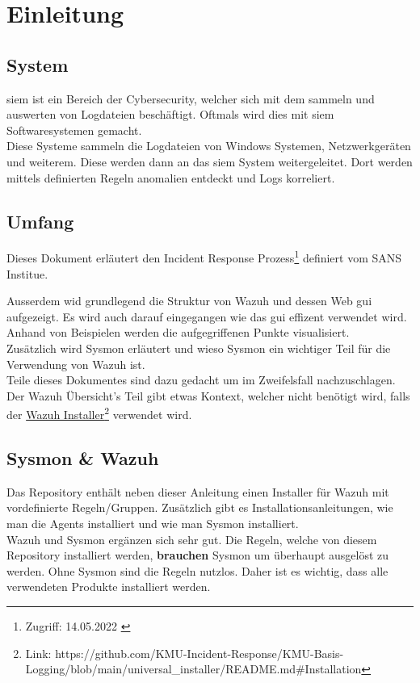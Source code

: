 \chapter{Einleitung}

\section{ System}
\acrfull{siem} ist ein Bereich der Cybersecurity, welcher sich mit dem sammeln und auswerten von Logdateien beschäftigt.
Oftmals wird dies mit \acrshort{siem} Softwaresystemen gemacht.\\

Diese Systeme sammeln die Logdateien von Windows Systemen, Netzwerkgeräten und weiterem.
Diese werden dann an das \acrshort{siem} System weitergeleitet.
Dort werden mittels definierten Regeln anomalien entdeckt und Logs korreliert.

\section{Umfang}
Dieses Dokument erläutert den Incident Response Prozess\footnote{Zugriff: 14.05.2022 \cite{sans-incident-handler-handbook}} definiert vom SANS Institue. 

Ausserdem wid grundlegend die Struktur von Wazuh und dessen Web \acrshort{gui} aufgezeigt.
Es wird auch darauf eingegangen wie das \acrshort{gui} effizent verwendet wird.
Anhand von Beispielen werden die aufgegriffenen Punkte visualisiert.\\

Zusätzlich wird Sysmon erläutert und wieso Sysmon ein wichtiger Teil für die Verwendung von Wazuh ist.\\

Teile dieses Dokumentes sind dazu gedacht um im Zweifelsfall nachzuschlagen.
Der Wazuh Übersicht's Teil gibt etwas Kontext, welcher nicht benötigt wird, falls der \href{https://github.com/KMU-Incident-Response/KMU-Basis-Logging/blob/main/universal\_installer/README.md\#Installation}{Wazuh Installer}\footnote{Link: https://github.com/KMU-Incident-Response/KMU-Basis-Logging/blob/main/universal\_installer/README.md\#Installation} verwendet wird.

\section{Sysmon \& Wazuh}
Das Repository enthält neben dieser Anleitung einen Installer für Wazuh mit vordefinierte Regeln/Gruppen.
Zusätzlich gibt es Installationsanleitungen, wie man die Agents installiert und wie man Sysmon installiert.\\

Wazuh und Sysmon ergänzen sich sehr gut.
Die Regeln, welche von diesem Repository installiert werden, \textbf{brauchen} Sysmon um überhaupt ausgelöst zu werden.
Ohne Sysmon sind die Regeln nutzlos. 
Daher ist es wichtig, dass alle verwendeten Produkte installiert werden.